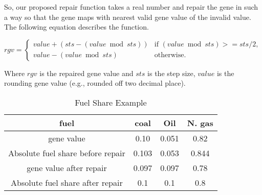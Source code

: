 \documentclass{article}
\begin{document}
So, our proposed repair function takes a real number and repair the gene in such a way so that the gene maps with nearest valid gene value of the invalid value. 
The following equation describes the function. 


\begin{equation*}
\label{eq:Representation of capacity design variables2}
rgv =
\begin{cases}
value + (sts - (value\bmod{sts})) & \text{if } (value \bmod{ sts}) >= sts/2, \\
value - (value \bmod{ sts}) & \text{otherwise}.
\end{cases}
\end{equation*}

Where $rgv$ is the repaired gene value and $sts$ is the step size, $value$ is the rounding gene value (e.g., rounded off two decimal place).


\begin{table}
\centering
\caption {Fuel Share Example}
\label{table:example fuel share}

\begin{tabular}{c|c|c|c}\hline
fuel & coal & Oil & N. gas \\ \hline
gene value& 0.10 & 0.051 & 0.82 \\ \hline
Absolute fuel share before repair& 0.103 &0.053&0.844\\ \hline
gene value after repair & 0.097 & 0.097 & 0.78 \\ \hline
Absolute fuel share after repair & 0.1 & 0.1 & 0.8 \\ \hline   

\end{tabular}
\end{table}

\end{document}
